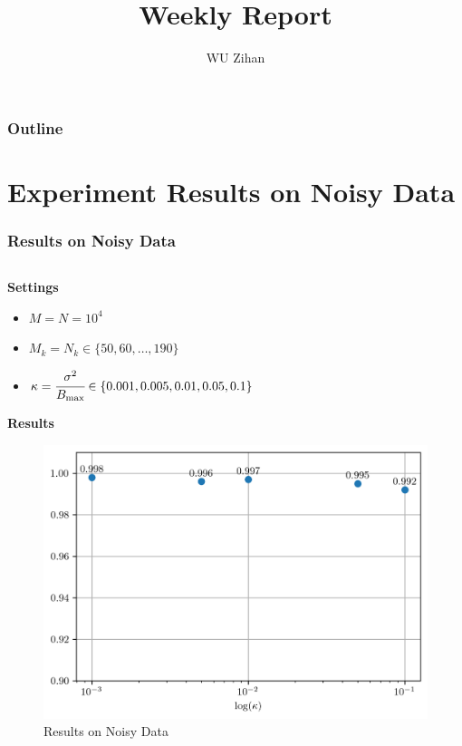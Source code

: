 \documentclass{beamer}
\title{Weekly Report}
\author{WU Zihan}
\begin{document}
\maketitle
\begin{frame}
    \frametitle{Outline}
    \tableofcontents
\end{frame}

\section{Experiment Results on Noisy Data}
\begin{frame}
    \frametitle{Results on Noisy Data}
    \begin{columns}
        \begin{column}{0.5\textwidth}
            \textbf{Settings}
            \scriptsize
            \begin{itemize}
                \item $M = N = 10^4$
                \item $M_k = N_k \in \{50, 60, \dots, 190\}$
                \item $\kappa = \cfrac{\sigma^2}{B_{\max}} \in \{0.001 , 0.005, 0.01, 0.05, 0.1\}$
            \end{itemize}
            \textbf{Results}
            \begin{figure}[htb]
                \centering
                \includegraphics[width=\linewidth]{result.png}
                \caption{Results on Noisy Data}
                \label{fig:results}
            \end{figure}

\end{column}
\end{columns}
\end{frame}
\end{document}
